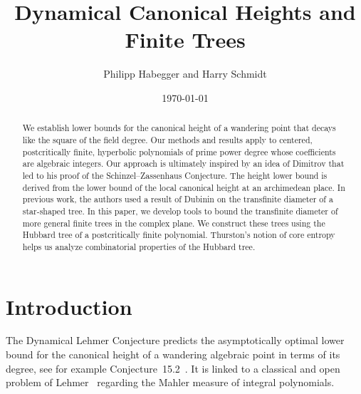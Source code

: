 \documentclass[12pt,oneside,a4]{amsart}
\numberwithin{maincounter}{section}
\numberwithin{equation}{section}
\newcommand{\commit}{}
\newcommand{\branch}{}
\newcommand{\gitshortid}{}
\renewcommand{\commit}{\dots~(in \emph{packed-refs})}}
\renewcommand{\gitshortid}{\StrLeft{\commit}{7}}
\begin{document}
\title{Dynamical Canonical Heights  and Finite Trees}

\author{Philipp Habegger and Harry Schmidt}
\date{\today}

\maketitle

\begin{abstract}
  We establish lower bounds for the canonical height of a wandering
  point that decays like the square of the field degree. Our methods and
  results apply to centered, postcritically finite, hyperbolic
  polynomials of prime power degree whose coefficients are algebraic
  integers. Our approach is ultimately inspired by an
  idea of Dimitrov that led to his proof of the Schinzel--Zassenhaus
  Conjecture.
  The height lower bound is derived from the lower bound of the local
  canonical height at an archimedean place. In previous work, the
  authors used a result of Dubinin on the transfinite diameter of a
  star-shaped tree.
  In this paper,  we develop tools to bound the
  transfinite diameter of more general finite trees in the complex
  plane.
  We construct these trees using the Hubbard tree of a postcritically finite
  polynomial. 
  Thurston's notion of core entropy helps us analyze
  combinatorial properties of the Hubbard tree.
\end{abstract}



\tableofcontents







%
\section{Introduction}


The Dynamical Lehmer Conjecture predicts the asymptotically
optimal lower bound
for the canonical height of a wandering algebraic point in terms of
its degree, see for example
Conjecture~15.2~\cite{BIJMST:currenttrends}. It is linked
to a classical and open problem of Lehmer~\cite{Lehmer:33} regarding the Mahler
measure of integral polynomials.
\end{document}
